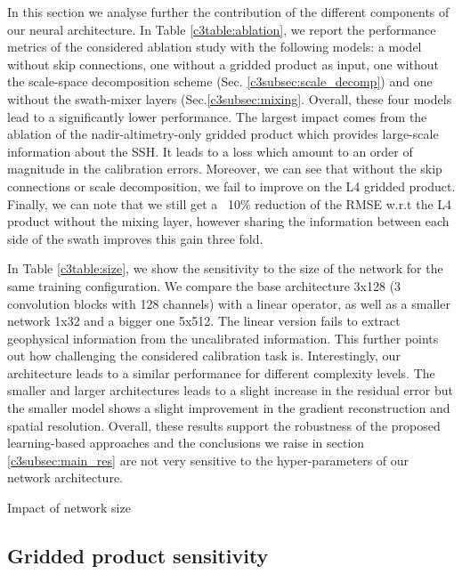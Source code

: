 \begin{bibunit}
In this section we analyse further the contribution of the different components of our neural architecture. 
In Table \ref{c3table:ablation}, we report 
the performance metrics of the considered ablation study with the following models:
a model without skip connections, one without a gridded product as input, one without the scale-space decomposition scheme (Sec. \ref{c3subsec:scale_decomp}) and one without the swath-mixer layers (Sec.\ref{c3subsec:mixing}. Overall, these four models lead to a significantly lower performance. 
The largest impact comes from the ablation of the nadir-altimetry-only gridded product which provides large-scale information about the SSH. It leads to a loss which amount to an order of magnitude in the calibration errors.
Moreover, we can see that without the skip connections or scale decomposition, we fail to improve on the L4 gridded product.
Finally, we can note that we still get a ~10\% reduction of the RMSE w.r.t the L4 product without the mixing layer, however sharing the information between each side of the swath improves this gain three fold.

% 

In Table \ref{c3table:size}, we show the sensitivity to the size of the network for the same training configuration. We compare the base architecture 3x128 (3 convolution blocks with 128 channels) with a linear operator, as well as a smaller network 1x32 and a bigger one 5x512. The linear version fails to extract geophysical information from the uncalibrated information. This further points out how challenging the considered calibration task is. Interestingly, our architecture leads to a similar performance for different complexity levels. The smaller and larger architectures leads to a slight increase in the residual error but the smaller model shows a slight improvement in the gradient reconstruction and spatial resolution.
Overall, these results support the robustness of the proposed learning-based approaches and the conclusions we raise in section \ref{c3subsec:main_res} are not very sensitive to the hyper-parameters of our network architecture.
\begin{table}[t]
\begin{center}

\end{center}
\caption{Impact of network size}
\label{c3table:size}
\end{table}

\subsection{Gridded product sensitivity} 
\label{c3subsec:gridded_sens}
\noindent


\end{bibunit}
